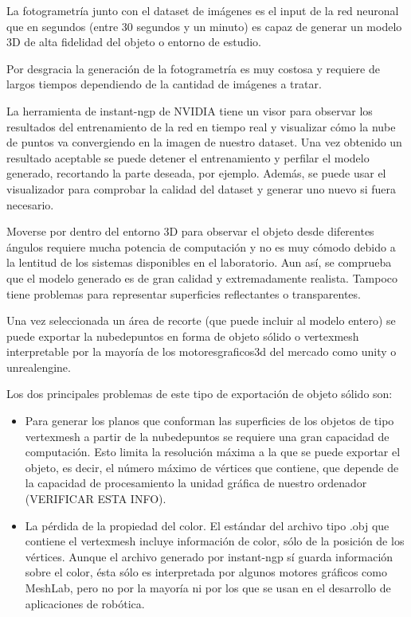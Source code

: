 \documentclass[a4paper, 12pt, spanish, twoside]{article}
\begin{document}
La fotogrametría junto con el dataset de imágenes es el input de la red neuronal que en segundos (entre 30 segundos y un minuto) es capaz de generar un modelo 3D de alta fidelidad del objeto o entorno de estudio. 


Por desgracia la generación de la fotogrametría es muy costosa y requiere de largos tiempos dependiendo de la cantidad de imágenes a tratar. 

La herramienta de instant-ngp de NVIDIA tiene un visor para observar los resultados del entrenamiento de la red en tiempo real y visualizar cómo la nube de puntos va convergiendo en la imagen de nuestro dataset. Una vez obtenido un resultado aceptable se puede detener el entrenamiento y perfilar el modelo generado, recortando la parte deseada, por ejemplo. Además, se puede usar el visualizador para comprobar la calidad del dataset y generar uno nuevo si fuera necesario. 

Moverse por dentro del entorno 3D para observar el objeto desde diferentes ángulos requiere mucha potencia de computación y no es muy cómodo debido a la lentitud de los sistemas disponibles en el laboratorio. Aun así, se comprueba que el modelo generado es de gran calidad y extremadamente realista. Tampoco tiene problemas para representar superficies reflectantes o transparentes. 


Una vez seleccionada un área de recorte (que puede incluir al modelo entero) se puede exportar la \gls{nubedepuntos} en forma de objeto sólido o \gls{vertexmesh} interpretable por la mayoría de los \gls{motoresgraficos3d} del mercado como \gls{unity} o \gls{unrealengine}. 

Los dos principales problemas de este tipo de exportación de objeto sólido son: 

\begin{itemize} 
\item Para generar los planos que conforman las superficies de los objetos de tipo \gls{vertexmesh} a partir de la \gls{nubedepuntos}  se requiere una gran capacidad de computación. Esto limita la resolución máxima a la que se puede exportar el objeto, es decir, el número máximo de vértices que contiene, que depende de la capacidad de procesamiento la unidad gráfica de nuestro ordenador (VERIFICAR ESTA INFO). 

\item La pérdida de la propiedad del color. El estándar del archivo tipo .obj que contiene el \gls{vertexmesh} incluye información de color, sólo de la posición de los vértices. Aunque el archivo generado por instant-ngp sí guarda información sobre el color, ésta sólo es interpretada por algunos motores gráficos como MeshLab, pero no por la mayoría ni por los que se usan en el desarrollo de aplicaciones de robótica. 
\end{itemize} 
\end{document}
